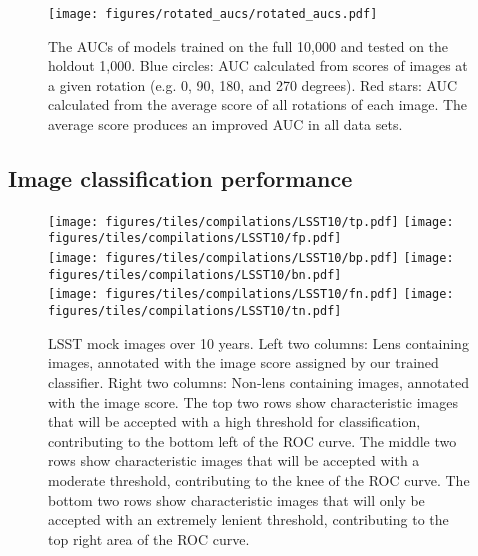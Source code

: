 \documentclass{emulateapj}
\begin{document}
\begin{figure}[t]\label{fig:rotation_test}
\begin{center}
\texttt{[image: figures/rotated\_aucs/rotated\_aucs.pdf]}
\caption{The AUCs of models trained on the full 10,000 and tested on
  the holdout 1,000.  Blue circles: AUC calculated from scores of
  images at a given rotation (e.g. 0, 90, 180, and 270 degrees).  Red
  stars: AUC calculated from the average score of all rotations of
  each image.  The average score produces an improved AUC in all data
  sets.}
\end{center}
\end{figure}



\subsection{Image classification performance}\label{sec:performance}

\begin{figure*}[t]\label{fig:ROCsamplesLSST10}
\begin{center}
\texttt{[image: figures/tiles/compilations/LSST10/tp.pdf]}\hspace{5pt}
\texttt{[image: figures/tiles/compilations/LSST10/fp.pdf]}\\\vspace{5pt}
\texttt{[image: figures/tiles/compilations/LSST10/bp.pdf]}\hspace{5pt}
\texttt{[image: figures/tiles/compilations/LSST10/bn.pdf]}\\\vspace{5pt}
\texttt{[image: figures/tiles/compilations/LSST10/fn.pdf]}\hspace{5pt}
\texttt{[image: figures/tiles/compilations/LSST10/tn.pdf]}\\
\caption{LSST mock images over 10 years. Left two columns: Lens
  containing images, annotated with the image score assigned by our
  trained classifier.  Right two columns: Non-lens containing images,
  annotated with the image score.  The top two rows show
  characteristic images that will be accepted with a high threshold
  for classification, contributing to the bottom left of the ROC
  curve.  The middle two rows show characteristic images that will be
  accepted with a moderate threshold, contributing to the knee of the
  ROC curve.  The bottom two rows show characteristic images that will
  only be accepted with an extremely lenient threshold, contributing
  to the top right area of the ROC curve.}
\end{center}
\end{figure*}
\end{document}
